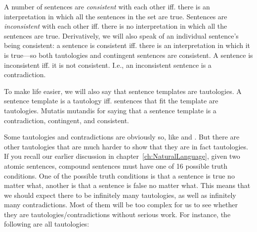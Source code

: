 A number of sentences are \emph{consistent} with each other iff.  there is an 
interpretation in which all the sentences in the set are true. Sentences are  
\emph{inconsistent} with each other iff.  there is no interpretation in which 
all the sentences are true.  Derivatively, we will also speak of an individual 
sentence's being consistent: a sentence is consistent iff. there is an 
interpretation in which it is true---so both tautologies and contingent 
sentences are consistent.  A sentence is inconsistent iff. it is not consistent.  
I.e., an inconsistent sentence is a contradiction.
 

To make life easier, we will also say that sentence templates are tautologies.  
A sentence template is a tautology iff. sentences that fit the template are 
tautologies. Mutatis mutandis for saying that a sentence template is a 
contradiction, contingent, and consistent.

Some tautologies and contradictions are obviously so, like  
and . But there are other tautologies that are much harder to 
show that they are in fact tautologies. If you recall our earlier discussion in 
chapter~\ref{ch:NaturalLanguage}, given two atomic sentences, compound sentences 
must have one of 16 possible truth conditions. One of the possible truth 
conditions is that a sentence is true no matter what, another is that a sentence 
is false no matter what.  This means that we should expect there to be 
infinitely many tautologies, as well as infinitely many contradictions. Most of 
them will be too complex for us to see whether they are 
tautologies/contradictions without serious work. For instance, the following are 
all tautologies:

